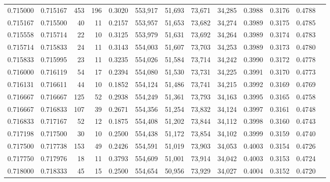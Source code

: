 \begin{tabular}{rrrrrrrrrrrrr}
0.715000 & 0.715167 &   453 & 196 &                                     0.3020 & 553,917 &  51,693 &  73,671 &  34,285 & 0.3988 & 0.3176 & 0.4788 \\
0.715167 & 0.715500 &    40 &  11 &                                     0.2157 & 553,957 &  51,653 &  73,682 &  34,274 & 0.3989 & 0.3175 & 0.4785 \\
0.715558 & 0.715714 &    22 &  10 &                                     0.3125 & 553,979 &  51,631 &  73,692 &  34,264 & 0.3989 & 0.3174 & 0.4783 \\
0.715714 & 0.715833 &    24 &  11 &                                     0.3143 & 554,003 &  51,607 &  73,703 &  34,253 & 0.3989 & 0.3173 & 0.4780 \\
0.715833 & 0.715995 &    23 &  11 &                                     0.3235 & 554,026 &  51,584 &  73,714 &  34,242 & 0.3990 & 0.3172 & 0.4778 \\
0.716000 & 0.716119 &    54 &  17 &                                     0.2394 & 554,080 &  51,530 &  73,731 &  34,225 & 0.3991 & 0.3170 & 0.4773 \\
0.716131 & 0.716611 &    44 &  10 &                                     0.1852 & 554,124 &  51,486 &  73,741 &  34,215 & 0.3992 & 0.3169 & 0.4769 \\
0.716667 & 0.716667 &   125 &  52 &                                     0.2938 & 554,249 &  51,361 &  73,793 &  34,163 & 0.3995 & 0.3165 & 0.4758 \\
0.716667 & 0.716833 &   107 &  39 &                                     0.2671 & 554,356 &  51,254 &  73,832 &  34,124 & 0.3997 & 0.3161 & 0.4748 \\
0.716833 & 0.717167 &    52 &  12 &                                     0.1875 & 554,408 &  51,202 &  73,844 &  34,112 & 0.3998 & 0.3160 & 0.4743 \\
0.717198 & 0.717500 &    30 &  10 &                                     0.2500 & 554,438 &  51,172 &  73,854 &  34,102 & 0.3999 & 0.3159 & 0.4740 \\
0.717500 & 0.717738 &   153 &  49 &                                     0.2426 & 554,591 &  51,019 &  73,903 &  34,053 & 0.4003 & 0.3154 & 0.4726 \\
0.717750 & 0.717976 &    18 &  11 &                                     0.3793 & 554,609 &  51,001 &  73,914 &  34,042 & 0.4003 & 0.3153 & 0.4724 \\
0.718000 & 0.718333 &    45 &  15 &                                     0.2500 & 554,654 &  50,956 &  73,929 &  34,027 & 0.4004 & 0.3152 & 0.4720 \\

\end{tabular}
